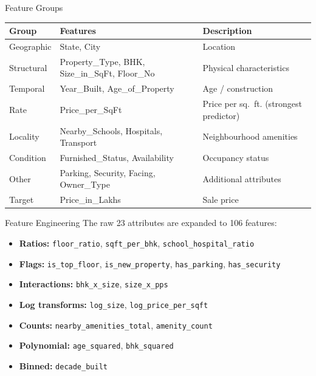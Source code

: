 \documentclass[aspectratio=169, 12pt]{beamer}
\begin{document}
\begin{frame}{Feature Groups}
  \begin{center}
    \small
    \begin{tabular}{lll}
      \toprule
      Group & Features & Description \\
      \midrule
      Geographic & State, City & Location \\
      Structural & Property\_Type, BHK, Size\_in\_SqFt, Floor\_No &
        Physical characteristics \\
      Temporal & Year\_Built, Age\_of\_Property & Age / construction \\
      Rate & Price\_per\_SqFt & Price per sq.\ ft. (strongest predictor) \\
      Locality & Nearby\_Schools, Hospitals, Transport &
        Neighbourhood amenities \\
      Condition & Furnished\_Status, Availability & Occupancy status \\
      Other & Parking, Security, Facing, Owner\_Type & Additional attributes \\
      Target & Price\_in\_Lakhs & Sale price \\
      \bottomrule
    \end{tabular}
  \end{center}
\end{frame}

\begin{frame}{Feature Engineering}
  The raw 23 attributes are expanded to 106 features:
  \begin{itemize}
    \item \textbf{Ratios:} \texttt{floor\_ratio}, \texttt{sqft\_per\_bhk},
          \texttt{school\_hospital\_ratio}
    \item \textbf{Flags:} \texttt{is\_top\_floor}, \texttt{is\_new\_property},
          \texttt{has\_parking}, \texttt{has\_security}
    \item \textbf{Interactions:} \texttt{bhk\_x\_size}, \texttt{size\_x\_pps}
    \item \textbf{Log transforms:} \texttt{log\_size},
          \texttt{log\_price\_per\_sqft}
    \item \textbf{Counts:} \texttt{nearby\_amenities\_total},
          \texttt{amenity\_count}
    \item \textbf{Polynomial:} \texttt{age\_squared}, \texttt{bhk\_squared}
    \item \textbf{Binned:} \texttt{decade\_built}
  \end{itemize}
\end{frame}
\end{document}
